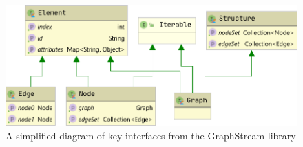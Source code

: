 \begin{figure}[ht]
\includegraphics[width=0.65\linewidth]{graphstream_diagram.pdf}
\caption{A simplified diagram of key interfaces from the GraphStream library}
\label{fig:graphstream_diagram}
\end{figure}
